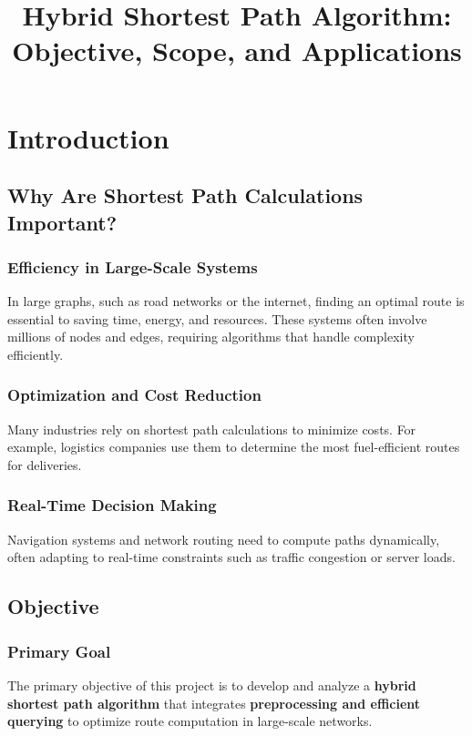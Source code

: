 \chapter{Introduction}

\title{Hybrid Shortest Path Algorithm: Objective, Scope, and Applications}

	\section{Why Are Shortest Path Calculations Important?}
	
	\subsection{Efficiency in Large-Scale Systems}
	In large graphs, such as road networks or the internet, finding an optimal route is essential to saving time, energy, and resources. These systems often involve millions of nodes and edges, requiring algorithms that handle complexity efficiently.
	
	\subsection{Optimization and Cost Reduction}
	Many industries rely on shortest path calculations to minimize costs. For example, logistics companies use them to determine the most fuel-efficient routes for deliveries.
	
	\subsection{Real-Time Decision Making}
	Navigation systems and network routing need to compute paths dynamically, often adapting to real-time constraints such as traffic congestion or server loads.
	

	
	\section{Objective}
	
	\subsection{Primary Goal}
	The primary objective of this project is to develop and analyze a \textbf{hybrid shortest path algorithm} that integrates \textbf{preprocessing and efficient querying} to optimize route computation in large-scale networks. 
	
